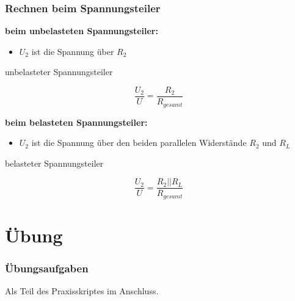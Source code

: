 \begin{frame}
	\frametitle{Rechnen beim Spannungsteiler}
	\textbf{beim unbelasteten Spannungsteiler:}
	\begin{itemize}
		\item $U_2$ ist die Spannung über $R_2$ 
	\end{itemize}
	\begin{block}{unbelasteter Spannungsteiler}
	  \begin{center}
	    $$\frac{U_2}{U} = \frac{R_2}{R_{gesamt}}$$
	  \end{center}
	\end{block}

	\textbf{beim belasteten Spannungsteiler:}
	\begin{itemize}
		\item $U_2$ ist die Spannung über den beiden parallelen Widerstände $R_2$ und $R_L$
	\end{itemize}
	\begin{block}{belasteter Spannungsteiler}
	  \begin{center}
	    $$\frac{U_2}{U} = \frac{R_{2}||R_{L}}{R_{gesamt}}$$
	  \end{center}
	\end{block}
\end{frame}

\section{Übung}

\begin{frame}
    \frametitle{Übungsaufgaben}

    Als Teil des Praxisskriptes im Anschluss.

\end{frame}

